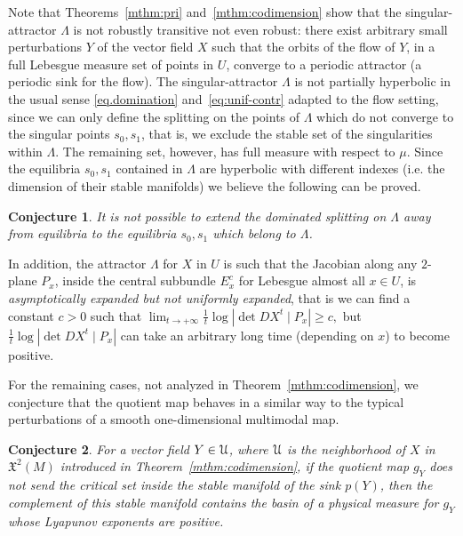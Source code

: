 \documentclass[reqno,12pt,a4paper]{amsart}
\theoremstyle{plain}
\newtheorem{conjecture}{Conjecture}
\theoremstyle{definition}
\begin{document}
Note that Theorems~\ref{mthm:pri} and~\ref{mthm:codimension}
show that the singular-attractor $\Lambda$ is not robustly
transitive not even robust: there exist arbitrary small
perturbations $Y$ of the vector field $X$ such that the
orbits of the flow of $Y$, in a full Lebesgue measure set of
points in $U$, converge to a periodic attractor (a periodic
sink for the flow). The singular-attractor $\Lambda$ is not
partially hyperbolic in the usual sense
\eqref{eq.domination} and~\eqref{eq:unif-contr} adapted to
the flow setting, since we can only define the splitting on
the points of $\Lambda$ which do not converge to the
singular points $s_0,s_1$, that is, we exclude the stable
set of the singularities within $\Lambda$. The remaining
set, however, has full measure with respect to $\mu$. Since
the equilibria $s_0,s_1$ contained in $\Lambda$ are
hyperbolic with different indexes (i.e. the dimension of
their stable manifolds) we believe the following can be
proved.

\begin{conjecture}\label{conj:noextension}
  It is not possible to extend the dominated splitting on
  $\Lambda$ away from equilibria to the equilibria $s_0,s_1$
  which belong to $\Lambda$.
\end{conjecture}

In addition, the attractor $\Lambda$ for $X$ in $U$ is such
that the Jacobian along any $2$-plane $P_x$, inside the
central subbundle $E^c_x$ for Lebesgue almost all $x\in U$,
is \emph{asymptotically expanded but not uniformly
  expanded}, that is we can find a constant $c>0$ such that
$
  \lim_{t\to+\infty}\frac1t\log|\det DX^t\mid P_x|\ge c,
$
but $\frac1t\log|\det DX^t\mid P_x|$ can take an arbitrary
long time (depending on $x$) to become positive.

For the remaining cases, not analyzed in
Theorem~\ref{mthm:codimension}, we conjecture that the
quotient map behaves in a similar way to the typical
perturbations of a smooth one-dimensional multimodal map.

\begin{conjecture}
  \label{conj:physicalmeas}
  For a vector field $Y\in{\EuScript{U}}$, where ${\EuScript{U}}$ is the
  neighborhood of $X$ in ${{\mathfrak X}}^2(M)$ introduced in
  Theorem~\ref{mthm:codimension}, if the quotient map $g_Y$
  \emph{does not send} the critical set inside the stable
  manifold of the sink $p(Y)$, then the complement of this
  stable manifold contains the basin of a physical measure
  for $g_Y$ whose Lyapunov exponents are positive.
\end{conjecture}
\end{document}
